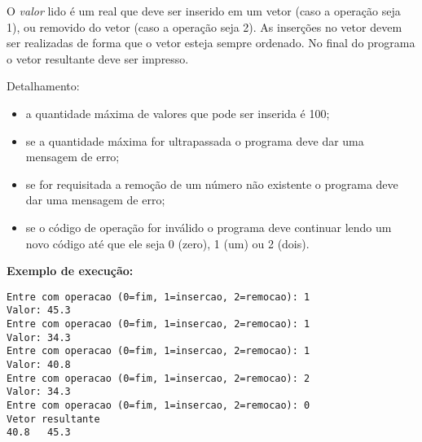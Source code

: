 O {\em valor} lido é um real que deve ser inserido em um vetor (caso a
operação seja 1), ou removido do vetor (caso a operação seja 2).   As
inserções no vetor devem ser realizadas de forma que o vetor esteja sempre
ordenado.   No final do programa o vetor resultante deve ser impresso.

Detalhamento:
\begin{itemize}
\item a quantidade máxima de valores que pode  ser inserida é 100;
\item se a quantidade máxima for ultrapassada o programa deve dar uma
mensagem de erro;
\item se for requisitada a remoção de um número não existente o programa
  deve dar uma mensagem de erro;
\item se o código de operação for inválido o programa deve continuar lendo
um novo código até que ele seja 0 (zero), 1 (um) ou 2 (dois).
\end{itemize}

\noindent
{\bf Exemplo de execução: }
\begin{small}
\begin{verbatim}
Entre com operacao (0=fim, 1=insercao, 2=remocao): 1 
Valor: 45.3 
Entre com operacao (0=fim, 1=insercao, 2=remocao): 1 
Valor: 34.3 
Entre com operacao (0=fim, 1=insercao, 2=remocao): 1 
Valor: 40.8
Entre com operacao (0=fim, 1=insercao, 2=remocao): 2 
Valor: 34.3
Entre com operacao (0=fim, 1=insercao, 2=remocao): 0
Vetor resultante
40.8   45.3 
\end{verbatim}
\end{small}

